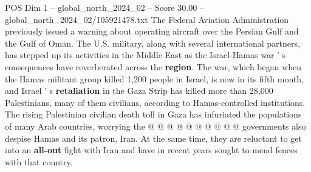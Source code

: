 \begin{textsample}{POS Dim 1 – global\_north\_2024\_02 – Score 30.00 – global\_north\_2024\_02/105921478.txt}
The Federal Aviation Administration previously issued a warning about operating aircraft over the Persian Gulf and the Gulf of Oman.
The U.S. military, along with several international partners, has stepped up its activities in the Middle East as the Israel-Hamas war ' s consequences have reverberated across the \textbf{region}.
The war, which began when the Hamas militant group killed 1,200 people in Israel, is now in its fifth month, and Israel ' s \textbf{retaliation} in the Gaza Strip has killed more than 28,000 Palestinians, many of them civilians, according to Hamas-controlled institutions.
The rising Palestinian civilian death toll in Gaza has infuriated the populations of many Arab countries, worrying the @ @ @ @ @ @ @ @ @ @ governments also despise Hamas and its patron, Iran.
At the same time, they are reluctant to get into an \textbf{all-out} fight with Iran and have in recent years sought to mend fences with that country.

\end{textsample}
